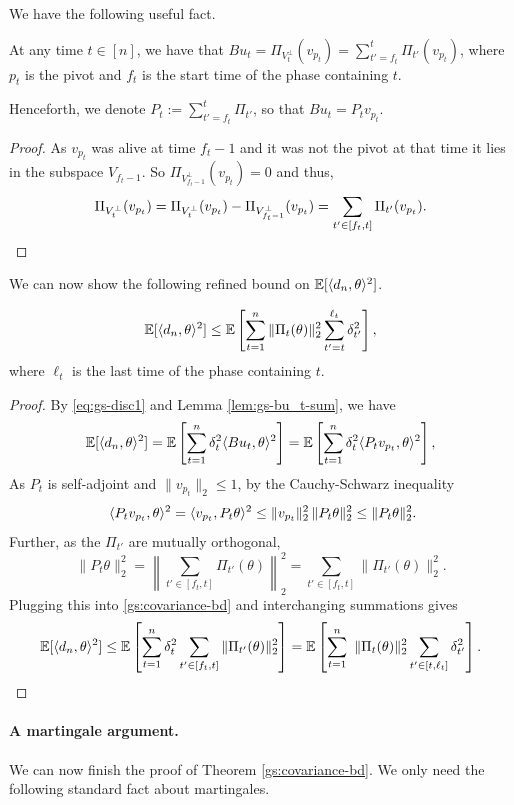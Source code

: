 We have the following useful fact.
\begin{lemma}
\label{lem:gs-bu_t-sum}
    At any time $t \in [n]$, we have that
    $Bu_t =  \Pi_{V_{t}^\perp}(v_{p_t})= \sum_{t'=f_t}^t \Pi_{t'} (v_{p_t})$,
    where $p_t$ is the pivot and $f_t$ is the start time of the phase containing $t$. 
\end{lemma}
Henceforth, we denote $P_t:= \sum_{t'=f_t}^t \Pi_{t'}$, so that 
$Bu_t = P_t v_{p_t}$.
\begin{proof}
As $v_{p_t}$ was alive  at time $f_t-1$ and it was not the pivot at that time it  lies in the subspace $V_{f_t-1}$. So  $\Pi_{V_{f_t-1}^\perp}(v_{p_t})=0$ and thus,
    \[  \Pi_{V_{t}^\perp}(v_{p_t}) = \Pi_{V_{t}^\perp}(v_{p_t}) - \Pi_{V_{f_t-1}^\perp}(v_{p_t}) 
     = \sum_{t'\in [f_t,t]} \Pi_{t'} (v_{p_t}). \qedhere\]
\end{proof}
We can now show the following refined bound on $\mathbb{E}[\langle d_n,\theta\rangle^2]$.
\begin{lemma} \label{lem: gs-ref-bd} 
\[\mathbb{E}[\langle d_n,\theta\rangle^2] \leq  \mathbb{E}\left[  \sum_{t=1}^n \|\Pi_{t} (\theta) \|_2^2\sum_{t'=t}^{\ell_t}  \delta_{t'}^2\right]  ,\] where $\ell_t$ is the last time of the phase containing $t$.
\end{lemma}
\begin{proof}
By  \eqref{eq:gs-disc1} and Lemma \ref {lem:gs-bu_t-sum}, we have 
\begin{equation}
    \mathbb{E}[\langle d_n,\theta\rangle^2] = \mathbb{E} \left[ \sum_{t=1}^n \delta_t^2 \langle Bu_t, \theta\rangle^2\right] = \mathbb{E} \left[ \sum_{t=1}^n \delta_t^2 \langle P_t v_{p_t}, \theta\rangle^2\right], \label{gs:covariance-bd}
\end{equation} 
As $P_t$ is self-adjoint and  $\|v_{p_t}\|_2\leq 1$, by the Cauchy-Schwarz inequality
   \[\ \langle  P_t v_{p_t}, \theta \rangle^2  =  \langle  v_{p_t},P_t \theta \rangle^2 
     \leq \| v_{p_t}\|^2_2 \,\|P_t\theta\|^2_2 \leq \|P_t\theta\|^2_2.\]
     Further, as the $\Pi_{t'}$ are mutually orthogonal,
     \[\|P_t\theta\|^2_2 = \left\| \sum_{t' \in [f_t,t] }\Pi_{t'} (\theta) \right\|_2^2 = \sum_{t' \in [f_t,t]} \|\Pi_{t'}(\theta)\|_2^2.\] 
Plugging this into \eqref{gs:covariance-bd} and interchanging summations gives
   \[ \mathbb{E}[\langle d_n,\theta\rangle^2] \leq \mathbb{E}\left[ \sum_{t=1}^n \delta_t^2 \sum_{t'\in [f_t,t]} \|\Pi_{t'}(\theta)\|_2^2\right]  = \mathbb{E}\left[ \sum_{t=1}^n \   \|\Pi_{t}(\theta)\|_2^2 \sum_{t'\in[t,\ell_t]} \delta_{t'}^2 \right]. \qedhere\] 
\end{proof}

\paragraph{A martingale argument.} We can now finish the proof of Theorem \ref{gs:covariance-bd}.
We only need the following standard fact about martingales. 

